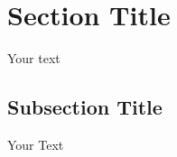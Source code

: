 \documentclass[12pt,letter]{article}
\title{\mytitle}
\author{\myauthor \\ \texttt{\myemail} }
\date{\today}
\begin{document}
\maketitle
\begin{abstract}
Abstract text goes here.
\end{abstract}

\section{Section Title}
Your text

\subsection{Subsection Title}
Your Text
\end{document}
